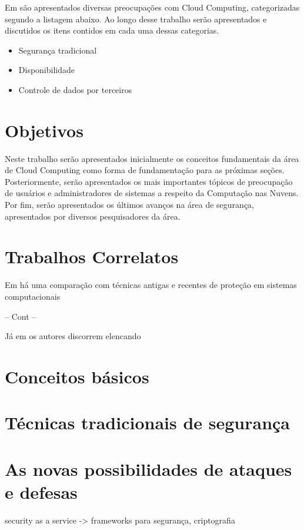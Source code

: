\documentclass[brazil,12pt]{article}
\begin{document}
Em \cite{controlling-data-in-cloud} são apresentados diversas preocupações com
Cloud Computing, categorizadas segundo a listagem abaixo. Ao longo desse
trabalho serão apresentados e discutidos os itens contidos em cada uma dessas
categorias.
\begin{itemize}
  \item Segurança tradicional
  \item Disponibilidade
  \item Controle de dados por terceiros
\end{itemize}

\section{Objetivos}
Neste trabalho serão apresentados inicialmente os conceitos fundamentais da área
de Cloud Computing como forma de fundamentação para as próximas seções.
Posteriormente, serão apresentados os mais importantes tópicos de preocupação de
usuários e administradores de sistemas a respeito da Computação nas Nuvens.
Por fim, serão apresentados os últimos avanços na área de segurança,
apresentados por diversos pesquisadores da área.

\section{Trabalhos Correlatos}

Em \cite{whats-new-about-cloud-security} há uma comparação com técnicas antigas
e recentes de proteção em sistemas computacionais

-- Cont --

Já em \cite{controlling-data-in-cloud} os autores discorrem elencando 


\section{Conceitos básicos}

\section{Técnicas tradicionais de segurança}

\section{As novas possibilidades de ataques e defesas}



security as a service -> frameworks para segurança, criptografia
\nocite{*}


\end{document}
